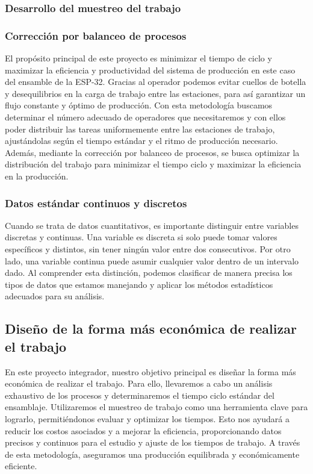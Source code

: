     \subsubsection{Desarrollo del muestreo del trabajo}
    
    
    \subsubsection{Corrección por balanceo de procesos}
    El propósito principal de este proyecto es minimizar el tiempo de ciclo y maximizar la eficiencia y productividad del sistema de producción en este caso del ensamble de la ESP-32. Gracias al operador podemos evitar cuellos de botella y desequilibrios en la carga de trabajo entre las estaciones, para así garantizar un flujo constante y óptimo de producción. Con esta metodología buscamos determinar el número adecuado de operadores que necesitaremos y con ellos poder distribuir las tareas uniformemente entre las estaciones de trabajo, ajustándolas según el tiempo estándar y el ritmo de producción necesario. Además, mediante la corrección por balanceo de procesos, se busca optimizar la distribución del trabajo para minimizar el tiempo ciclo y maximizar la eficiencia en la producción.
    \subsubsection{Datos estándar continuos y discretos}
    Cuando se trata de datos cuantitativos, es importante distinguir entre variables discretas y continuas. Una variable es discreta si solo puede tomar valores específicos y distintos, sin tener ningún valor entre dos consecutivos. Por otro lado, una variable continua puede asumir cualquier valor dentro de un intervalo dado. Al comprender esta distinción, podemos clasificar de manera precisa los tipos de datos que estamos manejando y aplicar los métodos estadísticos adecuados para su análisis.
    \subsection{Diseño de la forma más económica de realizar el trabajo}
    En este proyecto integrador, nuestro objetivo principal es diseñar la forma más económica de realizar el trabajo. Para ello, llevaremos a cabo un análisis exhaustivo de los procesos y determinaremos el tiempo ciclo estándar del ensamblaje. Utilizaremos el muestreo de trabajo como una herramienta clave para lograrlo, permitiéndonos evaluar y optimizar los tiempos. Esto nos ayudará a reducir los costos asociados y a mejorar la eficiencia, proporcionando datos precisos y continuos para el estudio y ajuste de los tiempos de trabajo. A través de esta metodología, aseguramos una producción equilibrada y económicamente eficiente.
